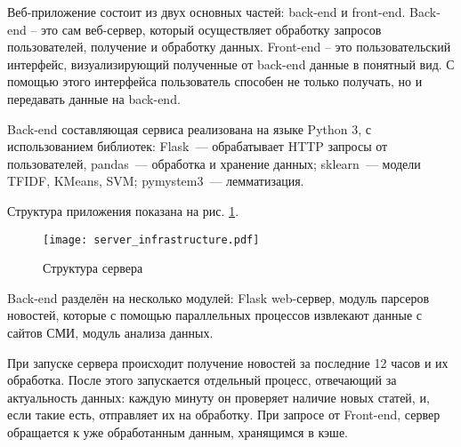 Веб-приложение состоит из двух основных частей: back-end и front-end. Back-end -- это сам веб-сервер,
который осуществляет обработку запросов пользователей, получение и обработку данных.
Front-end -- это пользовательский интерфейс, визуализирующий полученные от back-end данные в понятный вид.
С помощью этого интерфейса пользователь способен не только получать, но и передавать данные на back-end.

Back-end составляющая сервиса реализована на языке Python 3, с использованием библиотек: Flask~---
обрабатывает HTTP запросы от пользователей, pandas~--- обработка и хранение данных; sklearn~--- модели TFIDF, KMeans, SVM;
pymystem3~--- лемматизация.

Структура приложения показана на рис. \ref{server_struct}.

\begin{figure}[h]
    \centering
    \texttt{[image: server\_infrastructure.pdf]}
    \caption{Структура сервера}
    \label{server_struct}
\end{figure}

Back-end разделён на несколько модулей: Flask web-сервер, модуль парсеров новостей, которые
с помощью параллельных процессов извлекают данные с сайтов СМИ, модуль анализа данных.

При запуске сервера происходит получение новостей за последние 12 часов и их обработка.
После этого запускается отдельный процесс, отвечающий за актуальность данных: каждую минуту он
проверяет наличие новых статей, и, если такие есть, отправляет их на обработку. При запросе от Front-end, сервер
обращается к уже обработанным данным, хранящимся в кэше.

